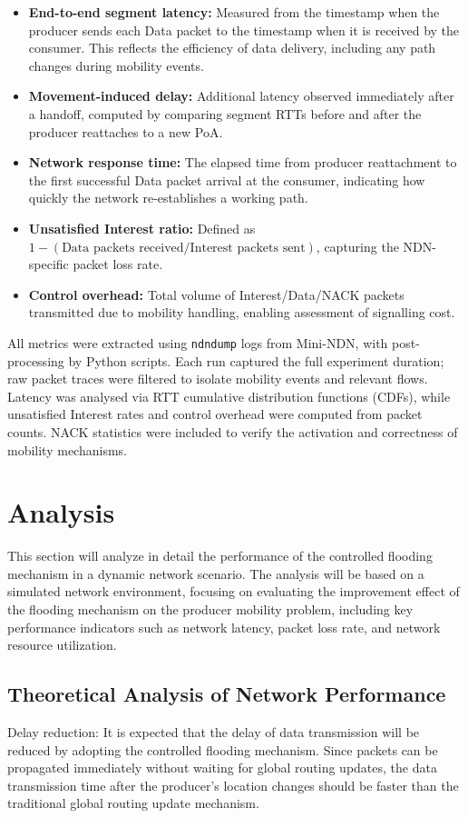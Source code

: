 \documentclass[conference]{IEEEtran}
\begin{document}
\begin{itemize}
    \item \textbf{End-to-end segment latency:} Measured from the timestamp when the producer sends each Data packet to the timestamp when it is received by the consumer. This reflects the efficiency of data delivery, including any path changes during mobility events.
    \item \textbf{Movement-induced delay:} Additional latency observed immediately after a handoff, computed by comparing segment RTTs before and after the producer reattaches to a new PoA.
    \item \textbf{Network response time:} The elapsed time from producer reattachment to the first successful Data packet arrival at the consumer, indicating how quickly the network re-establishes a working path.
    \item \textbf{Unsatisfied Interest ratio:} Defined as $1 - (\text{Data packets received} / \text{Interest packets sent})$, capturing the NDN-specific packet loss rate.
    \item \textbf{Control overhead:} Total volume of Interest/Data/NACK packets transmitted due to mobility handling, enabling assessment of signalling cost.
\end{itemize}

All metrics were extracted using \texttt{ndndump} logs from Mini-NDN, with post-processing by Python scripts. Each run captured the full experiment duration; raw packet traces were filtered to isolate mobility events and relevant flows. Latency was analysed via RTT cumulative distribution functions (CDFs), while unsatisfied Interest rates and control overhead were computed from packet counts. NACK statistics were included to verify the activation and correctness of mobility mechanisms.


\section{Analysis}
This section will analyze in detail the performance of the controlled flooding mechanism in a dynamic network scenario. The analysis will be based on a simulated network environment, focusing on evaluating the improvement effect of the flooding mechanism on the producer mobility problem, including key performance indicators such as network latency, packet loss rate, and network resource utilization.

\subsection{Theoretical Analysis of Network Performance}
Delay reduction: It is expected that the delay of data transmission will be reduced by adopting the controlled flooding mechanism. Since packets can be propagated immediately without waiting for global routing updates, the data transmission time after the producer's location changes should be faster than the traditional global routing update mechanism.
\end{document}
